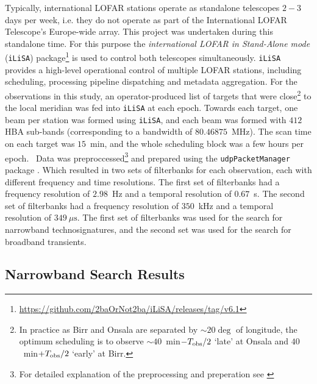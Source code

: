Typically, international LOFAR stations operate as standalone telescopes $2-3$ days per week, i.e. they do not operate as part of the International LOFAR Telescope's Europe-wide array. This project was undertaken during this standalone time. For this purpose the \emph{international LOFAR in Stand-Alone mode} (\texttt{iLiSA}) package\footnote{\url{https://github.com/2baOrNot2ba/iLiSA/releases/tag/v6.1}} is used to control both telescopes simultaneously. \texttt{iLiSA} provides a high-level operational control of multiple LOFAR stations, including scheduling, processing pipeline dispatching and metadata aggregation. For the observations in this study, an operator-produced list of targets that were close\footnote{In practice as Birr and Onsala are separated by $\sim20\deg$ of longitude, the optimum scheduling is to observe $\sim 40$~min$-T_{\rm obs}/2$ `late' at Onsala and $40$~min$+T_{\rm obs}/2$ `early' at Birr.} to the local meridian was fed into \texttt{iLiSA} at each epoch. Towards each target, one beam per station was formed using \texttt{iLiSA}, and each beam was formed with $412$ HBA sub-bands (corresponding to a bandwidth of $80.46875$~MHz). The scan time on each target was $15$~min, and the whole scheduling block was a few hours per epoch. \ 
Data was preproccessed\footnote{For detailed explanation of the preprocessing and preperation see \cite{2019_Lebofsky}} and prepared using the \texttt{udpPacketManager} package \citep{David_JOSS}. Which resulted in two sets of filterbanks for each observation, each with different frequency and time resolutions. The first set of filterbanks had a frequency resolution of $2.98$~Hz and a temporal resolution of $0.67$~s. The second set of filterbanks had a frequency resolution of $350$~kHz and a temporal resolution of $349~\mu \text{s}$. The first set of filterbanks was used for the search for narrowband technosignatures, and the second set was used for the search for broadband transients. \

\subsection{Narrowband Search Results}

